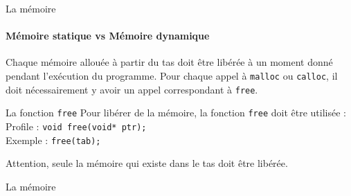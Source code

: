   	\begin{frame}{La mémoire}
  		\framesubtitle{Mémoire statique vs Mémoire dynamique}
  		\begin{alertblock}{
  			Chaque mémoire allouée à partir du tas doit être libérée à un moment donné pendant l'exécution du programme. Pour chaque appel à \texttt{malloc} ou \texttt{calloc}, il doit nécessairement y avoir un appel correspondant à \texttt{free}.}
  		\end{alertblock}
  		\begin{block}{La fonction \texttt{free}}
  			Pour libérer de la mémoire, la fonction \texttt{free} doit être utilisée :
  			\alert{Profile} : \texttt{void free(void* ptr);} \\
  			Exemple : \texttt{free(tab);}
  		\end{block}
  		\begin{alertblock}{Attention, seule la mémoire qui existe dans le tas doit être libérée.}
  		\end{alertblock}
  	\end{frame}
  



  	\begin{frame}{La mémoire}
  		\leakExmplOne
  	\end{frame}
  
